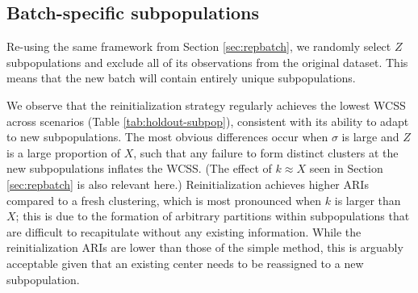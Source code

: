 \documentclass{article}
\begin{document}
\subsection{Batch-specific subpopulations}

Re-using the same framework from Section \ref{sec:repbatch}, we randomly select $Z$ subpopulations and exclude all of its observations from the original dataset.
This means that the new batch will contain entirely unique subpopulations.

We observe that the reinitialization strategy regularly achieves the lowest WCSS across scenarios (Table \ref{tab:holdout-subpop}), consistent with its ability to adapt to new subpopulations.
The most obvious differences occur when $\sigma$ is large and $Z$ is a large proportion of $X$, such that any failure to form distinct clusters at the new subpopulations inflates the WCSS.
(The effect of $k \approx X$ seen in Section \ref{sec:repbatch} is also relevant here.)
Reinitialization achieves higher ARIs compared to a fresh clustering, which is most pronounced when $k$ is larger than $X$;
this is due to the formation of arbitrary partitions within subpopulations that are difficult to recapitulate without any existing information.
While the reinitialization ARIs are lower than those of the simple method, this is arguably acceptable given that an existing center needs to be reassigned to a new subpopulation.
\end{document}
